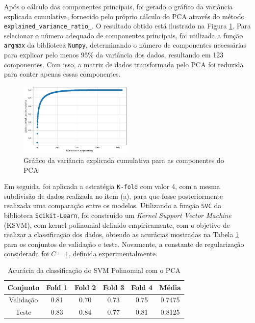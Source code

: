 \documentclass[]{abntex2}
\begin{document}
Após o cálculo das componentes principais, foi gerado o gráfico da variância explicada cumulativa, fornecido pelo próprio cálculo do PCA através do método \texttt{explained\_variance\_ratio\_}. O resultado obtido está ilustrado na Figura \ref{fig:vari_pca}. Para selecionar o número adequado de componentes principais, foi utilizada a função \texttt{argmax} da biblioteca \texttt{Numpy}, determinando o número de componentes necessárias para explicar pelo menos 95\% da variância dos dados, resultando em 123 componentes. Com isso, a matriz de dados transformada pelo PCA foi reduzida para conter apenas essas componentes.

\begin{figure}[H]
    \centering 
    \includegraphics[width=0.5\textwidth]{imgs/ex1/vari_pca.png}
    \caption{Gráfico da variância explicada cumulativa para as componentes do PCA}
    \label{fig:vari_pca} %
\end{figure}

Em seguida, foi aplicada a estratégia \texttt{K-fold} com valor 4, com a mesma subdivisão de dados realizada no item (a), para que fosse posteriormente realizada uma comparação entre os modelos. Utilizando a função \texttt{SVC} da biblioteca \texttt{Scikit-Learn}, foi construído um \textit{Kernel Support Vector Machine} (KSVM), com kernel polinomial definido empiricamente, com o objetivo de realizar a classificação dos dados, obtendo as acurácias mostradas na Tabela \ref{tab:pca_svm} para os conjuntos de validação e teste. Novamente, a constante de regularização considerada foi \(C=1\), definida experimentalmente.

\begin{table}[H]
    \centering
    \begin{tabular}{|c|c|c|c|c|c|}
    \hline
    \rowcolor[HTML]{C0C0C0} 
    Conjunto                          & Fold 1 & Fold 2 & Fold 3 & Fold 4 & Média  \\ \hline
    \cellcolor[HTML]{C0C0C0}Validação & 0.81   & 0.70   & 0.73   & 0.75   & 0.7475  \\ \hline
    \cellcolor[HTML]{C0C0C0}Teste     & 0.83   & 0.84   & 0.77   & 0.81   & 0.8125 \\ \hline
    \end{tabular}
    \caption{Acurácia da classificação do SVM Polinomial com o PCA}
    \label{tab:pca_svm}
\end{table}
\end{document}
